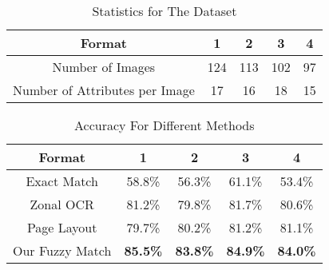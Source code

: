 %


\begin{table}[th]
\small
\caption{Statistics for The Dataset}
\label{tab:statis}
\centering
\begin{tabular}{|c|c|c|c|c|}
\hline
Format & 1 & 2 & 3 & 4\\
\hline \hline
Number of Images & 124 & 113 & 102 & 97\\ 
\hline
Number of Attributes per Image & 17 & 16 & 18 & 15 \\
\hline
\end{tabular}
\end{table}

\begin{table}[th]
\small
\caption{Accuracy For Different Methods}
\label{tab:compare}
\begin{tabular}{|c|c|c|c|c|}
\hline
Format & 1 & 2 & 3 & 4\\
\hline \hline
Exact Match & 58.8\% & 56.3\% & 61.1\% & 53.4\% \\
\hline
Zonal OCR & 81.2\% & 79.8\% & 81.7\% & 80.6\% \\
\hline
Page Layout & 79.7\% & 80.2\% & 81.2\% & 81.1\% \\
\hline
Our Fuzzy Match & {\bf 85.5\%} & {\bf 83.8\%} & {\bf 84.9\%} & {\bf 84.0\%}\\ 
\hline
\end{tabular}
\end{table}

